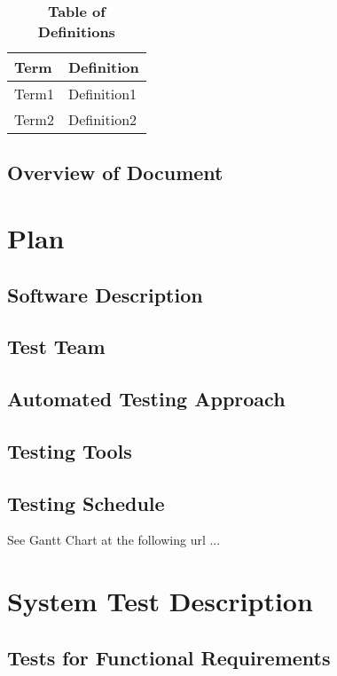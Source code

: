 \documentclass[12pt, titlepage]{article}
\begin{document}
\begin{table}[!htbp]
\caption{\textbf{Table of Definitions}} \label{Table}

\begin{tabularx}{\textwidth}{p{3cm}X}
\toprule
\textbf{Term} & \textbf{Definition}\\
\midrule
Term1 & Definition1\\
Term2 & Definition2\\
\bottomrule
\end{tabularx}

\end{table}

\subsection{Overview of Document}

\section{Plan}

\subsection{Software Description}

\subsection{Test Team}

\subsection{Automated Testing Approach}

\subsection{Testing Tools}

\subsection{Testing Schedule}

See Gantt Chart at the following url ...

\section{System Test Description}

\subsection{Tests for Functional Requirements}
\end{document}
